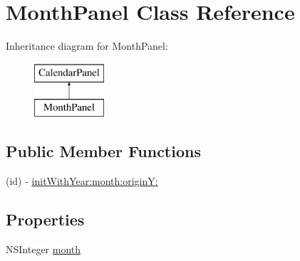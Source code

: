 \hypertarget{interface_month_panel}{\section{\-Month\-Panel \-Class \-Reference}
\label{interface_month_panel}
}
\-Inheritance diagram for \-Month\-Panel\-:\begin{figure}[H]
\begin{center}
\leavevmode
\includegraphics[height=2.000000cm]{interface_month_panel}
\end{center}
\end{figure}
\subsection*{\-Public \-Member \-Functions}
\begin{DoxyCompactItemize}
\item 
(id) -\/ \hyperlink{interface_month_panel_a81281be5f309c549595979d15ea23f1a}{init\-With\-Year\-:month\-:origin\-Y\-:}
\end{DoxyCompactItemize}
\subsection*{\-Properties}
\begin{DoxyCompactItemize}
\item 
\-N\-S\-Integer \hyperlink{interface_month_panel_af3fa55f0361f4a149e3a1267546e37d5}{month}
\end{DoxyCompactItemize}



